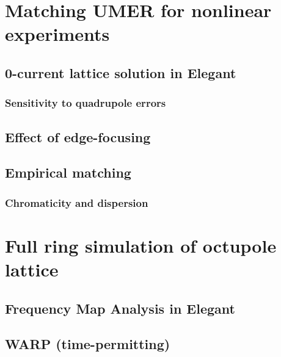 \section{Matching UMER for nonlinear experiments}
\subsection{0-current lattice solution in Elegant}
\subsubsection{Sensitivity to quadrupole errors}
\subsection{Effect of edge-focusing}
\subsection{Empirical matching}
\subsubsection{Chromaticity and dispersion}





\section{Full ring simulation of octupole lattice}
\subsection{Frequency Map Analysis in Elegant}
\subsection{WARP (time-permitting)}

